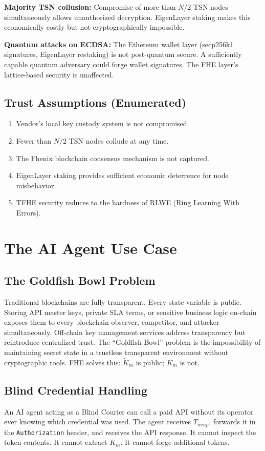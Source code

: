 \documentclass[conference]{IEEEtran}
\begin{document}
\textbf{Majority TSN collusion:} Compromise of more than $N/2$ TSN nodes simultaneously
allows unauthorized decryption. EigenLayer staking makes this economically costly but
not cryptographically impossible.

\textbf{Quantum attacks on ECDSA:} The Ethereum wallet layer (secp256k1 signatures,
EigenLayer restaking) is not post-quantum secure. A sufficiently capable quantum
adversary could forge wallet signatures. The FHE layer's lattice-based security
is unaffected.

\subsection{Trust Assumptions (Enumerated)}
\begin{enumerate}
\item Vendor's local key custody system is not compromised.
\item Fewer than $N/2$ TSN nodes collude at any time.
\item The Fhenix blockchain consensus mechanism is not captured.
\item EigenLayer staking provides sufficient economic deterrence for node misbehavior.
\item TFHE security reduces to the hardness of RLWE (Ring Learning With Errors).
\end{enumerate}

\section{The AI Agent Use Case}
\label{sec:agent}

\subsection{The Goldfish Bowl Problem}
Traditional blockchains are fully transparent. Every state variable is public. Storing
API master keys, private SLA terms, or sensitive business logic on-chain exposes them
to every blockchain observer, competitor, and attacker simultaneously. Off-chain key
management services address transparency but reintroduce centralized trust. The
``Goldfish Bowl'' problem is the impossibility of maintaining secret state in a
trustless transparent environment without cryptographic tools. FHE solves this:
$\tilde{K}_m$ is public; $K_m$ is not.

\subsection{Blind Credential Handling}
An AI agent acting as a Blind Courier can call a paid API without its operator ever
knowing which credential was used. The agent receives $T_{wrap}$, forwards it in the
\texttt{Authorization} header, and receives the API response. It cannot inspect the
token contents. It cannot extract $K_m$. It cannot forge additional tokens.
\end{document}
